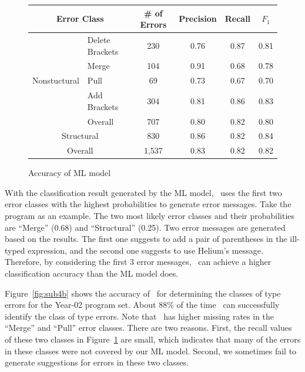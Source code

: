 \documentclass[12pt]{report}	%
\begin{document}
\begin{figure}
\centering
\begin{tabular}{r | l | c | c  c  c}
\toprule
  \multicolumn{2}{c|}{Error Class} & \# of Errors & Precision & Recall & $F_1$  \\ 
\midrule
\multirow{5}{*}{Nonstuctural} 
&  Delete Brackets & 230 & 0.76 & 0.87 & 0.81 \\ 
&  Merge & 104 & 0.91 & 0.68 & 0.78 \\ 
&  Pull & 69 & 0.73 & 0.67 & 0.70 \\ 
&  Add Brackets & 304 & 0.81 & 0.86 & 0.83 \\ 
&  Overall & 707 & 0.80 & 0.82 & 0.80 \\
\midrule
  \multicolumn{2}{c|}{Structural} & 830 & 0.86 & 0.82 & 0.84 \\ 
\midrule
\multicolumn{2}{c|}{Overall} & 1,537 & 0.83 & 0.82 & 0.82 \\
\bottomrule
\end{tabular}
\caption{Accuracy of ML model}
\label{fig:sub4a}
\end{figure}


With the classification result generated by the ML model,
\newCompiler\ uses the first two error classes with the
highest probabilities to generate error messages.
Take the program  as an example.
The two most likely error classes and their
probabilities are ``Merge'' (0.68) and ``Structural'' (0.25).
Two error messages are generated based on the results.
The first one suggests to add a pair of 
parentheses in the ill-typed expression,
and the second one suggests to use Helium's message.
Therefore, by considering the first 3 error messages,
\newCompiler\ can achieve a higher classification
accuracy than the ML model does.

%
Figure~\ref{fig:sub4b} shows the
accuracy of \newCompiler\ for determining the classes of
type errors for 
the Year-02 program set.
About 88\% of the time \newCompiler\
can successfully identify the class of type errors.
Note that \newCompiler\ has higher missing rates in the ``Merge''
and ``Pull'' error classes.
There are two reasons.
First, the recall values of these two classes in Figure~\ref{fig:sub4a}
are small, which indicates that many of the errors in these classes were 
not covered by our ML model.
Second, we sometimes fail to generate suggestions for 
errors in these two classes.
\end{document}
